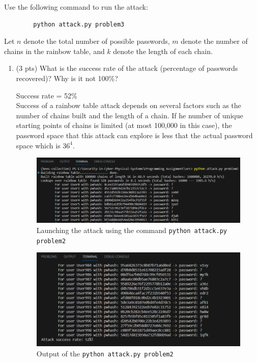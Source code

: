 \documentclass[11pt,letterpaper]{article}
\newenvironment{answer}{\em \color{blue} \begin{adjustwidth}{1cm}{1cm}}{\end{adjustwidth}}
\begin{document}
	Use the following command to run the attack:
	\begin{Verbatim}
		python attack.py problem3
	\end{Verbatim}
	
	Let $n$ denote the total number of possible passwords, $m$ denote the number of chains in the rainbow table, and $k$ denote the length of each chain.
	
	\begin{enumerate}
		\item (3 pts) What is the success rate of the attack (percentage of passwords recovered)? Why is it not 100\%?
		
		\begin{answer}
			
			Success rate = 52\%\\
			
			Success of a rainbow table attack depends on several factors such as the number of chains built and the length of a chain. If he number of unique starting points of chains is limited (at most 100,000 in this case), the password space that this attack can explore is less that the actual password space which is $36^4$.
			
			\begin{figure}[H]
				\centering
				\includegraphics[width=0.7\columnwidth]{images/p3/q11.png}
				\caption{Launching the attack using the command {\tt python attack.py problem2}}
			\end{figure}
		
			\begin{figure}[H]
				\centering
				\includegraphics[width=0.7\columnwidth]{images/p3/q12.png}
				\caption{Output of the {\tt python attack.py problem2}}
			\end{figure}
			

\end{answer}
\end{enumerate}
\end{document}
